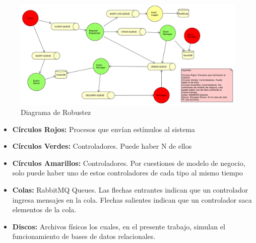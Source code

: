 \documentclass[a4paper,10pt]{article}
\begin{document}
        \begin{figure}[!htb]                                             
            \centering                                                   
            \includegraphics[width=20cm,angle=90,origin=c]{Imagenes/robustez.pdf}        
            \caption{Diagrama de Robustez} \label{DiagRobustez}
        \end{figure}

        \begin{itemize}
            \item \textbf{Círculos Rojos:} Procesos que envían estímulos al 
            sistema
            \item \textbf{Círculos Verdes:} Controladores. Puede haber N 
            de ellos          
            \item \textbf{Círculos Amarillos:} Controladores. Por cuestiones
            de modelo de negocio, solo puede haber uno de estos controladores
            de cada tipo al mismo tiempo
            \item \textbf{Colas:} RabbitMQ Queues. Las flechas entrantes 
            indican que un controlador ingresa mensajes en la cola. Flechas
            salientes indican que un controlador saca elementos de la cola.
            \item \textbf{Discos:} Archivos físicos los cuales, en el presente
            trabajo, simulan el funcionamiento de bases de datos relacionales.
        \end{itemize}

   
\end{document}
